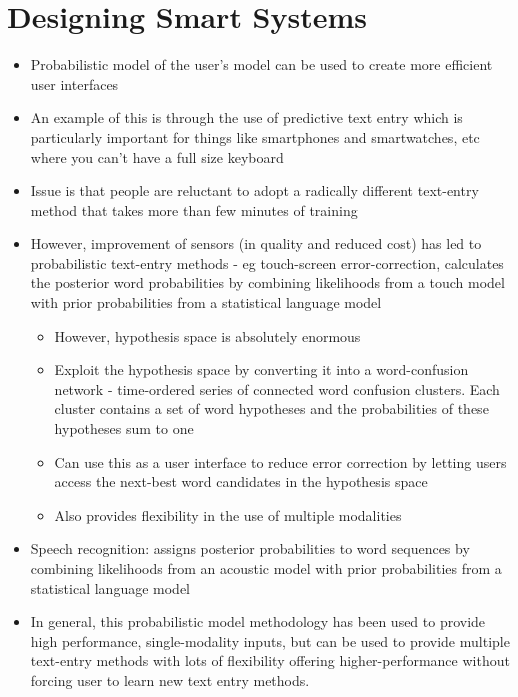 \documentclass{article}
\newenvironment{cons}{\par\color{red}}{\par}
\begin{document}
\section{Designing Smart Systems}
\begin{itemize}
    \item Probabilistic model of the user's model can be used to create more efficient user interfaces
    \item An example of this is through the use of predictive text entry which is particularly important for things like smartphones and smartwatches, etc where you can't have a full size keyboard
    \begin{cons}
    \item Issue is that people are reluctant to adopt a radically different text-entry method that takes more than few minutes of training
    \end{cons}
    \item However, improvement of sensors (in quality and reduced cost) has led to probabilistic text-entry methods - eg touch-screen error-correction, calculates the posterior word probabilities by combining likelihoods from a touch model with prior probabilities from a statistical language model
    \begin{itemize}
        \item However, hypothesis space is absolutely enormous 
        \item Exploit the hypothesis space by converting it into a word-confusion network - time-ordered series of connected word confusion clusters. Each cluster contains a set of word hypotheses and the probabilities of these hypotheses sum to one
        \item Can use this as a user interface to reduce error correction by letting users access the next-best word candidates in the hypothesis space
        \item Also provides flexibility in the use of multiple modalities
    \end{itemize}
    \item Speech recognition: assigns posterior probabilities to word sequences by combining likelihoods from an acoustic model with prior probabilities from a statistical language model
    \item In general, this probabilistic model methodology has been used to provide high performance, single-modality inputs, but can be used to provide multiple text-entry methods with lots of flexibility offering higher-performance without forcing user to learn new text entry methods.

\end{itemize}
\end{document}
